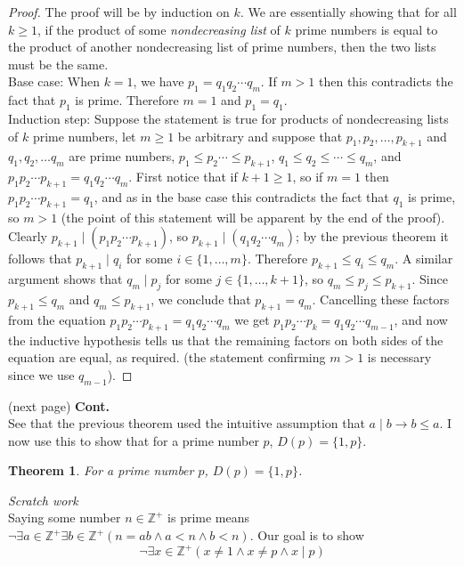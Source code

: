 \documentclass{report}
\newtheorem*{theorem}{Theorem}
\theoremstyle{definition}
\begin{document}
\begin{proof}
The proof will be by induction on $k$. We are essentially showing that for all $k\geq1$, if the product of some \textit{nondecreasing list} of $k$ prime numbers is equal to the product of another 
nondecreasing list of prime numbers, then the two lists must be the same.\\
\indent Base case: When $k=1$, we have $p_1=q_1q_2\cdots q_m$. If $m>1$ then this contradicts the fact that $p_1$ is prime. Therefore $m=1$ and $p_1=q_1$.\\
\indent Induction step: Suppose the statement is true for products of nondecreasing lists of $k$ prime numbers, let $m\geq1$ be arbitrary and suppose that 
$p_1,p_2,\ldots,p_{k+1}$ and $q_1,q_2,\ldots q_m$ are prime numbers, $p_1\leq p_2\cdots\leq p_{k+1}$, $q_1\leq q_2\leq\cdots\leq q_m$, and $p_1p_2\cdots p_{k+1}=q_1q_2\cdots q_m$. 
First notice that if $k+1\geq1$, so if $m=1$ then $p_1p_2\cdots p_{k+1}=q_1$, and as in the base case this contradicts the fact that $q_1$ is prime, so $m>1$ (the point of this statement will be 
apparent by the end of the proof).\\
\indent Clearly $p_{k+1}\mid(p_1p_2\cdots p_{k+1})$, so $p_{k+1}\mid(q_1q_2\cdots q_m)$; by the previous theorem it follows that $p_{k+1}\mid q_i$ for some $i\in\{1,\ldots,m\}$. 
Therefore $p_{k+1}\leq q_i\leq q_m$. A similar argument shows that $q_m\mid p_j$ for some $j\in\{1,\ldots,k+1\}$, so $q_m\leq p_j\leq p_{k+1}$. Since $p_{k+1}\leq q_m$ and $q_m\leq p_{k+1}$, we conclude that $p_{k+1}=q_m$. Cancelling these factors from the equation 
$p_1p_2\cdots p_{k+1}=q_1q_2\cdots q_m$ we get $p_1p_2\cdots p_{k}=q_1q_2\cdots q_{m-1}$, and now the inductive hypothesis tells us that the remaining factors on both sides of the equation are 
equal, as required. (the statement confirming $m>1$ is necessary since we use $q_{m-1}$).
\end{proof}
\noindent(next page)\newpage
\noindent\textbf{Cont.}\\
See that the previous theorem used the intuitive assumption that $a\mid b\to b\leq a$. I now use this to show that for a prime number $p$, $D(p)=\{1,p\}$.
\begin{theorem}
For a prime number $p$, $D(p)=\{1,p\}$.
\end{theorem}
\noindent\textit{Scratch work}\\
Saying some number $n\in\mathbb Z^+$ is prime means $\neg\exists a\in\mathbb Z^+\exists b\in\mathbb Z^+(n=ab\land a<n\land b<n)$. Our goal is to show
\begin{equation*}
\neg\exists x\in\mathbb Z^+(x\neq1\land x\neq p\land x\mid p)
\end{equation*}
\end{document}
